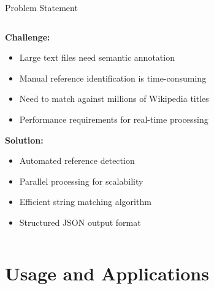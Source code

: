 \documentclass[aspectratio=169]{beamer}
\begin{document}
\begin{frame}{Problem Statement}
\begin{columns}
\begin{column}{0.6\textwidth}
\textbf{Challenge:}
\begin{itemize}
    \item Large text files need semantic annotation
    \item Manual reference identification is time-consuming
    \item Need to match against millions of Wikipedia titles
    \item Performance requirements for real-time processing
\end{itemize}

\vspace{0.3cm}
\textbf{Solution:}
\begin{itemize}
    \item Automated reference detection
    \item Parallel processing for scalability
    \item Efficient string matching algorithm
    \item Structured JSON output format
\end{itemize}
\end{column}
\begin{column}{0.4\textwidth}
\begin{center}
\end{center}
\end{column}
\end{columns}
\end{frame}

\section{Usage and Applications}
\end{document}
